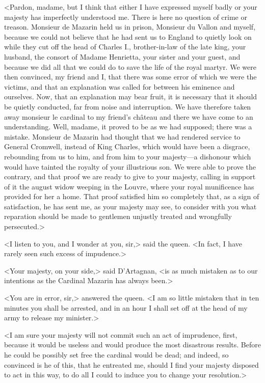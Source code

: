 <Pardon, madame, but I think that either I have expressed myself badly or your majesty has imperfectly understood me. There is here no question of crime or treason. Monsieur de Mazarin held us in prison, Monsieur du Vallon and myself, because we could not believe that he had sent us to England to quietly look on while they cut off the head of Charles I., brother-in-law of the late king, your husband, the consort of Madame Henrietta, your sister and your guest, and because we did all that we could do to save the life of the royal martyr. We were then convinced, my friend and I, that there was some error of which we were the victims, and that an explanation was called for between his eminence and ourselves. Now, that an explanation may bear fruit, it is necessary that it should be quietly conducted, far from noise and interruption. We have therefore taken away monsieur le cardinal to my friend's château and there we have come to an understanding. Well, madame, it proved to be as we had supposed; there was a mistake. Monsieur de Mazarin had thought that we had rendered service to General Cromwell, instead of King Charles, which would have been a disgrace, rebounding from us to him, and from him to your majesty—a dishonour which would have tainted the royalty of your illustrious son. We were able to prove the contrary, and that proof we are ready to give to your majesty, calling in support of it the august widow weeping in the Louvre, where your royal munificence has provided for her a home. That proof satisfied him so completely that, as a sign of satisfaction, he has sent me, as your majesty may see, to consider with you what reparation should be made to gentlemen unjustly treated and wrongfully persecuted.>

<I listen to you, and I wonder at you, sir,> said the queen. <In fact, I have rarely seen such excess of impudence.>

<Your majesty, on your side,> said D'Artagnan, <is as much mistaken as to our intentions as the Cardinal Mazarin has always been.>

<You are in error, sir,> answered the queen. <I am so little mistaken that in ten minutes you shall be arrested, and in an hour I shall set off at the head of my army to release my minister.>

<I am sure your majesty will not commit such an act of imprudence, first, because it would be useless and would produce the most disastrous results. Before he could be possibly set free the cardinal would be dead; and indeed, so convinced is he of this, that he entreated me, should I find your majesty disposed to act in this way, to do all I could to induce you to change your resolution.>

